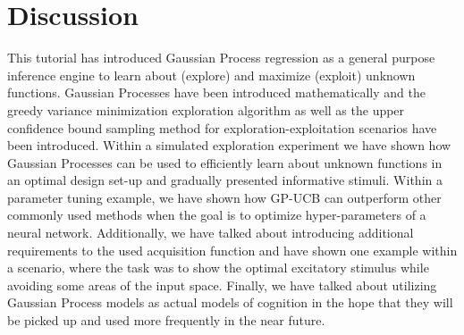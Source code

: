 \documentclass[authoryear,11pt,review]{elsarticle}
\begin{document}
\section{Discussion}
This tutorial has introduced Gaussian Process regression as a general purpose inference engine to learn about (explore) and maximize (exploit) unknown functions. Gaussian Processes have been introduced mathematically and the greedy variance minimization exploration algorithm as well as the upper confidence bound sampling method for exploration-exploitation scenarios have been introduced. Within a simulated exploration experiment we have shown how Gaussian Processes can be used to efficiently learn about unknown functions in an optimal design set-up and gradually presented informative stimuli. Within a parameter tuning example, we have shown how GP-UCB can outperform other commonly used methods when the goal is to optimize hyper-parameters of a neural network. Additionally, we have talked about introducing additional requirements to the used acquisition function and have shown one example within a scenario, where the task was to show the optimal excitatory stimulus while avoiding some areas of the input space. Finally, we have talked about utilizing Gaussian Process models as actual models of cognition in the hope that they will be picked up and used more frequently in the near future.\\
\end{document}
